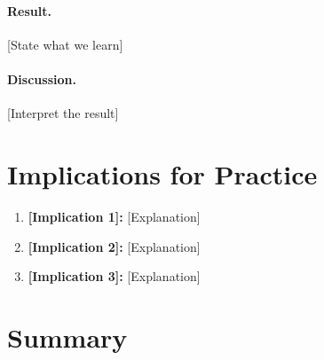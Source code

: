 \paragraph{Result.} [State what we learn]

\paragraph{Discussion.} [Interpret the result]


\section{Implications for Practice}
\label{sec:[code]-practice}


\begin{tcolorbox}[colback=green!5!white, colframe=green!75!black, 
    title=Practical Implications]
\begin{enumerate}
\item \textbf{[Implication 1]:} [Explanation]
\item \textbf{[Implication 2]:} [Explanation]
\item \textbf{[Implication 3]:} [Explanation]
\end{enumerate}
\end{tcolorbox}


%
%

\section{Summary}
\label{sec:[code]-summary}

